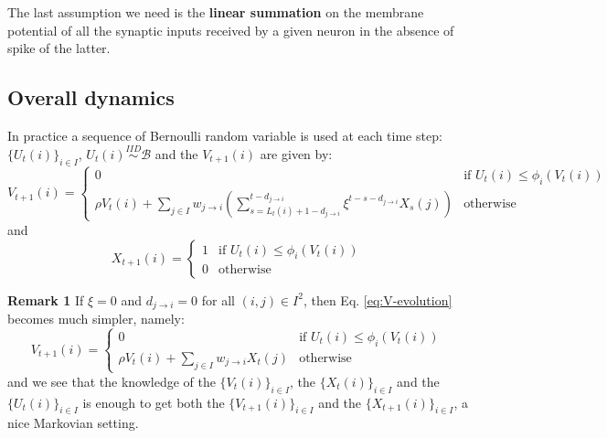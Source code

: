 \documentclass[11pt]{scrartcl}
\begin{document}
The last assumption we need is the \textbf{linear summation} on the membrane potential of all the synaptic inputs received by a given neuron in the absence of spike of the latter.

\subsection{Overall dynamics}
\label{sec:org6195c6e}
In practice a sequence of Bernoulli random variable is used at each time step: \(\{U_t(i)\}_{i \in I}\), \(U_t(i) \stackrel{IID}{\sim} \mathcal{B}\) and the \(V_{t+1}(i)\) are given by:
\begin{equation}\label{eq:V-evolution}
V_{t+1}(i) = \begin{cases}0 & \text{if } U_t(i) \le \phi_i\left(V_t(i)\right) \\ \rho V_{t}(i) + \sum_{j \in I}  w_{ j \to i} \left( \sum_{ s = L_t (i) +1 -d_{j\rightarrow i} }^{ t-d_{j\rightarrow i}}\xi^{t-s-d_{j\rightarrow i}}X_s (j)  \right) & \text{otherwise}   \end{cases}
\end{equation} 
and
\begin{equation}\label{eq:X-evolution}
X_{t+1}(i) = \begin{cases}1 & \text{if } U_t(i) \le \phi_i\left(V_t(i)\right) \\ 0 & \text{otherwise}   \end{cases}
\end{equation}

\textbf{Remark 1} If \(\xi=0\) and \(d_{j\rightarrow i} = 0\) for all \((i,j) \in I^2\), then Eq. \ref{eq:V-evolution} becomes much simpler, namely:
\begin{equation}\label{eq:V-evolution-simple}
V_{t+1}(i) = \begin{cases}0 & \text{if } U_t(i) \le \phi_i\left(V_t(i)\right) \\ \rho V_{t}(i) + \sum_{j \in I}  w_{ j \to i} X_t (j)  & \text{otherwise}   \end{cases}
\end{equation} 
and we see that the knowledge of the \(\{V_t(i)\}_{i \in I}\),  the \(\{X_t(i)\}_{i \in I}\) and the \(\{U_t(i)\}_{i \in I}\) is enough to get both the \(\{V_{t+1}(i)\}_{i \in I}\) and the \(\{X_{t+1}(i)\}_{i \in I}\), a nice Markovian setting.
\end{document}
